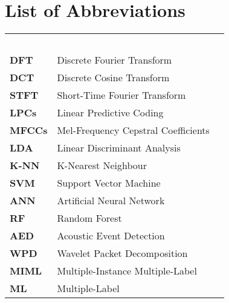

\chapter*{List of Abbreviations}

\renewcommand{\arraystretch}{1.4} 
\begin{longtable}{llr}
\multicolumn{3}{l}{\textbf{}\hspace{0.4\textwidth}~~}\\
\textbf{DFT}   &                    Discrete Fourier Transform \\
\textbf{DCT}    &                    Discrete Cosine Transform \\
\textbf{STFT} & Short-Time Fourier Transform \\
\textbf{LPCs}	 &                   Linear Predictive Coding \\
\textbf{MFCCs} &	       Mel-Frequency Cepstral Coefficients \\
\textbf{LDA}      &                  Linear Discriminant Analysis \\
\textbf{K-NN}	  &                  K-Nearest Neighbour \\
\textbf{SVM}	     &               Support Vector Machine \\
\textbf{ANN}    &                   Artificial Neural Network \\
\textbf{RF}     &                      Random Forest \\
\textbf{AED}	   &                 Acoustic Event Detection \\
\textbf{WPD}     &                 Wavelet Packet Decomposition \\
\textbf{MIML}   &                 Multiple-Instance Multiple-Label  \\ 
\textbf{ML}    &                      Multiple-Label \\
\end{longtable}

